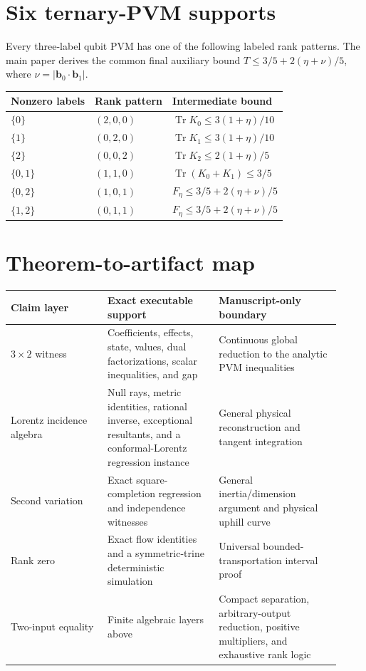 \documentclass[10pt]{article}
\newcommand{\Tr}{\operatorname{Tr}}
\begin{document}
\section{Six ternary-PVM supports}

Every three-label qubit PVM has one of the following labeled rank patterns.
The main paper derives the common final auxiliary bound
\(T\le3/5+2(\eta+\nu)/5\), where
\(\nu=|\bm b_0\cdot\bm b_1|\).

\begin{center}
\begin{tabular}{@{}lll@{}}
\toprule
Nonzero labels & Rank pattern & Intermediate bound\\
\midrule
\(\{0\}\) & \((2,0,0)\) & \(\Tr K_0\le3(1+\eta)/10\)\\
\(\{1\}\) & \((0,2,0)\) & \(\Tr K_1\le3(1+\eta)/10\)\\
\(\{2\}\) & \((0,0,2)\) & \(\Tr K_2\le2(1+\eta)/5\)\\
\(\{0,1\}\) & \((1,1,0)\) & \(\Tr(K_0+K_1)\le3/5\)\\
\(\{0,2\}\) & \((1,0,1)\) & \(F_\eta\le3/5+2(\eta+\nu)/5\)\\
\(\{1,2\}\) & \((0,1,1)\) & \(F_\eta\le3/5+2(\eta+\nu)/5\)\\
\bottomrule
\end{tabular}
\end{center}

\section{Theorem-to-artifact map}

\begin{center}
\small
\begin{tabular}{@{}
>{\raggedright\arraybackslash}p{0.27\linewidth}
>{\raggedright\arraybackslash}p{0.31\linewidth}
>{\raggedright\arraybackslash}p{0.34\linewidth}@{}}
\toprule
Claim layer & Exact executable support & Manuscript-only boundary\\
\midrule
\(3\times2\) witness & Coefficients, effects, state, values, dual
factorizations, scalar inequalities, and gap & Continuous global reduction
to the analytic PVM inequalities\\
Lorentz incidence algebra & Null rays, metric identities, rational inverse,
exceptional resultants, and a conformal-Lorentz regression instance & General
physical reconstruction and tangent integration\\
Second variation & Exact square-completion regression and independence
witnesses & General inertia/dimension argument and physical uphill curve\\
Rank zero & Exact flow identities and a symmetric-trine deterministic
simulation & Universal bounded-transportation interval proof\\
Two-input equality & Finite algebraic layers above & Compact separation,
arbitrary-output reduction, positive multipliers, and exhaustive rank logic\\
\bottomrule
\end{tabular}
\end{center}
\end{document}
